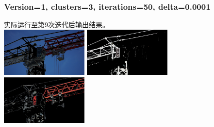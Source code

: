 \documentclass{article}
\begin{document}
\subsubsection{Version=1, clusters=3, iterations=50, delta=0.0001}
实际运行至第9次迭代后输出结果。\\
\includegraphics[width=0.33\textwidth]{src/i9d1e-4section1.png}
\includegraphics[width=0.33\textwidth]{src/i9d1e-4section2.png}
\includegraphics[width=0.33\textwidth]{src/i9d1e-4section3.png}\\
\end{document}
